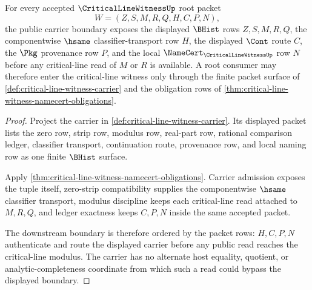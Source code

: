 \begin{theorem}
\label{thm:critical-line-witness-root-carrier-classifier-boundary}
For every accepted $\CriticalLineWitnessUp$ root packet
$$
W=(Z,S,M,R,Q,H,C,P,N),
$$
the public carrier boundary exposes the displayed $\BHist$ rows $Z,S,M,R,Q$, the componentwise $\hsame$ classifier-transport row $H$, the displayed $\Cont$ route $C$, the $\Pkg$ provenance row $P$, and the local $\NameCert_{\CriticalLineWitnessUp}$ row $N$ before any critical-line read of $M$ or $R$ is available. A root consumer may therefore enter the critical-line witness only through the finite packet surface of \autoref{def:critical-line-witness-carrier} and the obligation rows of \autoref{thm:critical-line-witness-namecert-obligations}.
\end{theorem}
\begin{proof}
Project the carrier in \autoref{def:critical-line-witness-carrier}. Its displayed packet lists the zero row, strip row, modulus row, real-part row, rational comparison ledger, classifier transport, continuation route, provenance row, and local naming row as one finite $\BHist$ surface.

Apply \autoref{thm:critical-line-witness-namecert-obligations}. Carrier admission exposes the tuple itself, zero-strip compatibility supplies the componentwise $\hsame$ classifier transport, modulus discipline keeps each critical-line read attached to $M,R,Q$, and ledger exactness keeps $C,P,N$ inside the same accepted packet.

The downstream boundary is therefore ordered by the packet rows: $H,C,P,N$ authenticate and route the displayed carrier before any public read reaches the critical-line modulus. The carrier has no alternate host equality, quotient, or analytic-completeness coordinate from which such a read could bypass the displayed boundary.
\end{proof}

